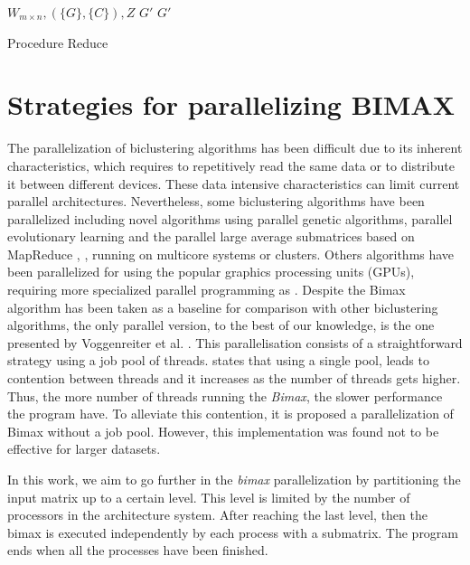 \documentclass[a4paper,conference]{IEEEtran}
\begin{document}
\begin{algorithm}
\begin{algorithmic}[1]
\REQUIRE $W_{m\times n}, (\{G\}, \{C\}), Z$
\ENSURE $G'$
\ENDIF
\ENDFOR
\RETURN $G'$
\caption{Procedure Reduce}\label{alg:Reduce}
\end{algorithmic}
\end{algorithm}

\section{Strategies for parallelizing BIMAX}
The parallelization of biclustering algorithms has been difficult due to its inherent characteristics, which requires to repetitively read the same data or to distribute it between different devices. These data intensive characteristics can limit current parallel architectures.
Nevertheless, some biclustering algorithms have been parallelized including novel algorithms using parallel genetic algorithms, parallel evolutionary learning and the parallel large average submatrices based on MapReduce \cite{WeiShen2011}, \cite{Huang2012} \cite{lin2015parallel}, running on multicore systems or clusters. Others algorithms have been parallelized for using the popular graphics processing units (GPUs), requiring more specialized parallel programming as \cite{orzechowski2015effective}. Despite the Bimax algorithm has been taken as a baseline for comparison with other biclustering algorithms, the only parallel version, to the best of our knowledge, is the one presented by Voggenreiter et al. \cite{voggenreiter2014biclustering}. This parallelisation consists of a straightforward strategy using a job pool of threads. \cite{voggenreiter2014biclustering} states that using a single pool, leads to contention between threads and it increases as the number of threads gets higher. Thus, the more number of threads running the \textit{Bimax}, the slower performance the program have. To alleviate this contention, it is proposed a parallelization of Bimax without a job pool. However, this implementation was found not to be effective for larger datasets. 

In this work, we aim to go further in the \textit{bimax} parallelization by partitioning the input matrix up to a certain level. This level is limited by the number of processors in the architecture system. After reaching the last level, then the bimax is executed independently by each process with a submatrix. The program ends when all the processes have been finished. 
\end{document}
